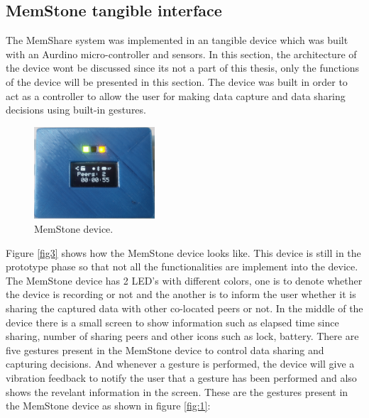 \documentclass[mscthesis]{usiinfthesis}
\begin{document}
\subsection{MemStone tangible interface}

The MemShare system was implemented in an tangible device which was built with an Aurdino micro-controller and sensors. In this section, the architecture of the device wont be discussed since its not a part of this thesis, only the functions of the device will be presented in this section. The device was built in order to act as a controller to allow the user for making data capture and data sharing decisions using built-in gestures.

\begin{figure}[!ht]
  \centering
  \includegraphics[width=0.40\textwidth]{MemStone}
  \caption{MemStone device.}
  \label{fig15}
\end{figure}

Figure \ref{fig3} shows how the MemStone device looks like. This device is still in the prototype phase so that not all the functionalities are implement into the device. The MemStone device has 2 LED's with different colors, one is to denote whether the device is recording or not and the another is to inform the user whether it is sharing the captured data with other co-located peers or not. In the middle of the device there is a small screen to show information such as elapsed time since sharing, number of sharing peers and other icons such as lock, battery. There are five gestures present in the MemStone device to control data sharing and capturing decisions. And whenever a gesture is performed, the device will give a vibration feedback to notify the user that a gesture has been performed and also shows the revelant information in the screen. These are the gestures present in the MemStone device as shown in figure \ref{fig:1}:
\end{document}
